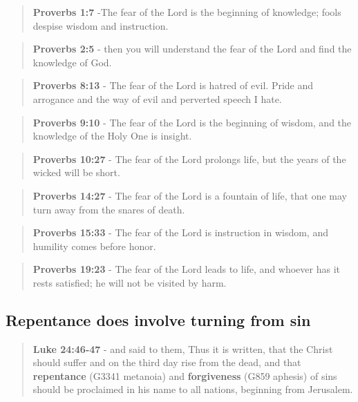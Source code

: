 \documentclass[11pt]{article}
\begin{document}
\begin{quote}
\textbf{Proverbs 1:7} -The fear of the Lord is the beginning of knowledge; fools despise wisdom and instruction.
\end{quote}

\begin{quote}
\textbf{Proverbs 2:5} - then you will understand the fear of the Lord and find the knowledge of God.
\end{quote}

\begin{quote}
\textbf{Proverbs 8:13} - The fear of the Lord is hatred of evil. Pride and arrogance and the way of evil and perverted speech I hate.
\end{quote}

\begin{quote}
\textbf{Proverbs 9:10} - The fear of the Lord is the beginning of wisdom, and the knowledge of the Holy One is insight.
\end{quote}

\begin{quote}
\textbf{Proverbs 10:27} - The fear of the Lord prolongs life, but the years of the wicked will be short.
\end{quote}

\begin{quote}
\textbf{Proverbs 14:27} - The fear of the Lord is a fountain of life, that one may turn away from the snares of death.
\end{quote}

\begin{quote}
\textbf{Proverbs 15:33} - The fear of the Lord is instruction in wisdom, and humility comes before honor.
\end{quote}

\begin{quote}
\textbf{Proverbs 19:23} - The fear of the Lord leads to life, and whoever has it rests satisfied; he will not be visited by harm.
\end{quote}

\subsection{Repentance does involve turning from sin}
\label{sec:org0e46510}
\begin{quote}
\textbf{Luke 24:46-47} - and said to them, Thus it is written, that the Christ should suffer and on the third day rise from the dead, and that \textbf{repentance} (G3341 metanoia) and \textbf{forgiveness} (G859 aphesis) of sins should be proclaimed in his name to all nations, beginning from Jerusalem.
\end{quote}
\end{document}
